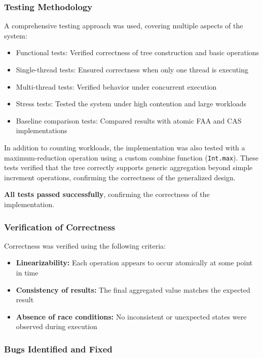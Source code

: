 \documentclass[11pt,a4paper]{article}
\begin{document}
\subsubsection*{Testing Methodology}

A comprehensive testing approach was used, covering multiple aspects of the system:

\begin{itemize}
    \item Functional tests: Verified correctness of tree construction and basic operations
    \item Single-thread tests: Ensured correctness when only one thread is executing
    \item Multi-thread tests: Verified behavior under concurrent execution
    \item Stress tests: Tested the system under high contention and large workloads
    \item Baseline comparison tests: Compared results with atomic FAA and CAS implementations
\end{itemize}
In addition to counting workloads, the implementation was also tested with a maximum-reduction operation using a custom combine function (\texttt{Int.max}). These tests verified that the tree correctly supports generic aggregation beyond simple increment operations, confirming the correctness of the generalized design.

\textbf{All tests passed successfully}, confirming the correctness of the implementation.

\subsubsection*{Verification of Correctness}

Correctness was verified using the following criteria:

\begin{itemize}
    \item \textbf{Linearizability:} Each operation appears to occur atomically at some point in time
    \item \textbf{Consistency of results:} The final aggregated value matches the expected result
    \item \textbf{Absence of race conditions:} No inconsistent or unexpected states were observed during execution
\end{itemize}

\subsubsection*{Bugs Identified and Fixed}
\end{document}
